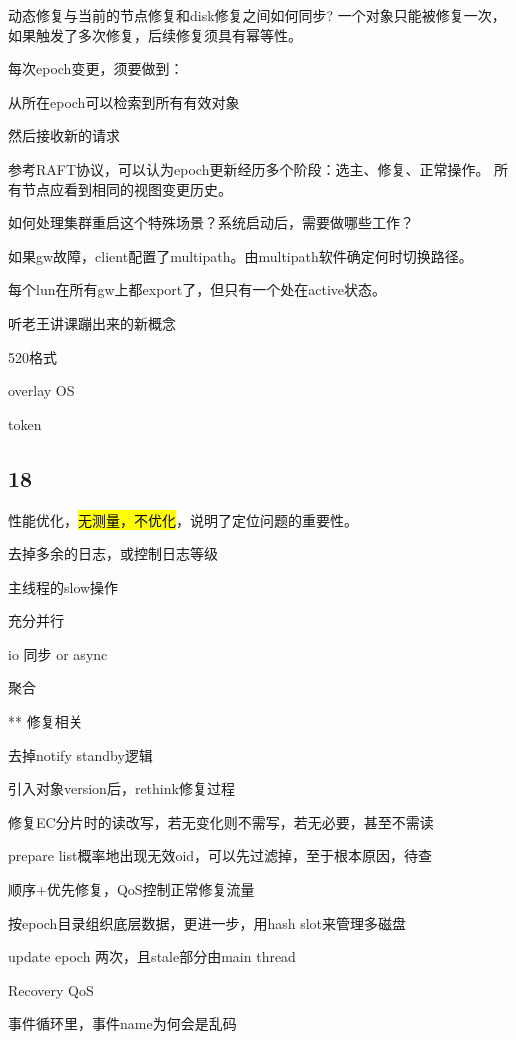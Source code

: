 动态修复与当前的节点修复和disk修复之间如何同步? 一个对象只能被修复一次，如果触发了多次修复，后续修复须具有幂等性。

每次epoch变更，须要做到：
\begin{enumbox}
\item 从所在epoch可以检索到所有有效对象
\item 然后接收新的请求
\end{enumbox}

参考RAFT协议，可以认为epoch更新经历多个阶段：选主、修复、正常操作。
所有节点应看到相同的视图变更历史。

如何处理集群重启这个特殊场景？系统启动后，需要做哪些工作？

\hrulefill

如果gw故障，client配置了multipath。由multipath软件确定何时切换路径。

每个lun在所有gw上都export了，但只有一个处在active状态。

\hrulefill

听老王讲课蹦出来的新概念
\begin{enumbox}
\item 520格式
\item overlay OS
\item token
\end{enumbox}

\subsection{18}

性能优化，\hl{无测量，不优化}，说明了定位问题的重要性。
\begin{enumbox}
\item 去掉多余的日志，或控制日志等级
\item 主线程的slow操作
\item 充分并行
\item io 同步 or async
\item 聚合
\item *** 修复相关
\item 去掉notify standby逻辑
\item 引入对象version后，rethink修复过程
\item 修复EC分片时的读改写，若无变化则不需写，若无必要，甚至不需读
\item prepare list概率地出现无效oid，可以先过滤掉，至于根本原因，待查
\item 顺序+优先修复，QoS控制正常修复流量
\item 按epoch目录组织底层数据，更进一步，用hash slot来管理多磁盘
\item update epoch 两次，且stale部分由main thread
\item Recovery QoS
\item 事件循环里，事件name为何会是乱码
\end{enumbox}

